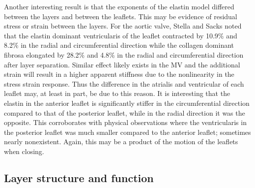     Another interesting result is that the exponents of the elastin model differed between the layers and between the leaflets. This may be evidence of residual stress or strain between the layers. For the aortic valve, Stella and Sacks \cite{stella_biaxial_2007} noted that the elastin dominant ventricularis of the leaflet contracted by 10.9\% and 8.2\% in the radial and circumferential direction while the collagen dominant fibrosa elongated by 28.2\% and 4.8\% in the radial and circumferential direction after layer separation. Similar effect likely exists in the MV and the additional strain will result in a higher apparent stiffness due to the nonlinearity in the stress strain response. Thus the difference in the atrialis and ventricular of each leaflet may, at least in part, be due to this reason. It is interesting that the elastin in the anterior leaflet is significantly stiffer in the circumferential direction compared to that of the posterior leaflet, while in the radial direction it was the opposite. This corroborates with physical observations where the ventricularis in the posterior leaflet was much smaller compared to the anterior leaflet; sometimes nearly nonexistent. Again, this may be a product of the motion of the leaflets when closing.
    
    
    
    
\subsection{Layer structure and function}

